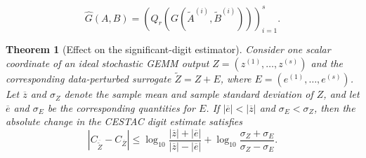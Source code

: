 \documentclass[10pt,a4paper]{amsart}
\newtheorem{theorem}{Theorem}
\begin{document}
\begin{equation}
\widehat{G}(A,B)=
\left(Q_r\!\left(G(\widetilde{A}^{(i)},\widetilde{B}^{(i)})\right)\right)_{i=1}^{s}.
\label{eq:gemm_lifted_perturbed}
\end{equation}

\begin{theorem}[Effect on the significant-digit estimator]
\label{thm:gemm_digit_bias}
Consider one scalar coordinate of an ideal stochastic GEMM output
$Z=(z^{(1)},\ldots,z^{(s)})$ and the corresponding data-perturbed
surrogate $\widetilde{Z}=Z+E$, where
$E=(e^{(1)},\ldots,e^{(s)})$. Let $\overline{z}$ and $\sigma_Z$ denote
the sample mean and sample standard deviation of $Z$, and let
$\overline{e}$ and $\sigma_E$ be the corresponding quantities for $E$.
If $|\overline{e}|<|\overline{z}|$ and $\sigma_E<\sigma_Z$, then the
absolute change in the CESTAC digit estimate satisfies
\begin{equation}
\left|
C_{\overline{\widetilde{Z}}}
-
C_{\overline{Z}}
\right|
\le
\log_{10}
\frac{|\overline{z}|+|\overline{e}|}
     {|\overline{z}|-|\overline{e}|}
+
\log_{10}
\frac{\sigma_Z+\sigma_E}
     {\sigma_Z-\sigma_E}.
\label{eq:digit_bias_bound}
\end{equation}
\end{theorem}
\end{document}
